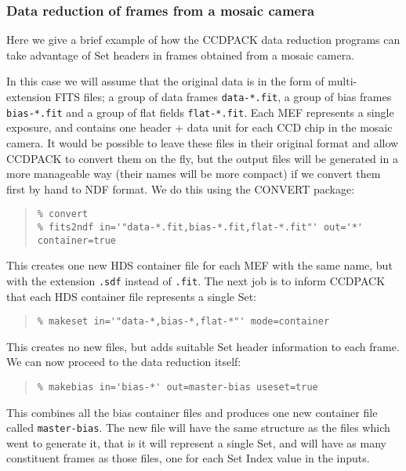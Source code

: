 \documentclass[twoside,11pt]{article}
\newcommand{\xref}[3]{#1}
\renewcommand{\_}{\texttt{\symbol{95}}}
\newenvironment{myquote}{\begin{quote}\begin{small}}{\end{small}\end{quote}}
\newcommand{\text}[1]{{\small \tt #1}}
\begin{document}
\subsubsection{Data reduction of frames from a mosaic camera}

Here we give a brief example of how the CCDPACK data reduction 
programs can take advantage of Set headers in frames obtained 
from a mosaic camera.

In this case we will assume that the original data is in the form
of multi-extension FITS files; a group of data frames \text{data-*.fit},
a group of bias frames \text{bias-*.fit} and a group of flat fields
\text{flat-*.fit}.  Each MEF represents a single exposure, 
and contains one header + data unit for each
CCD chip in the mosaic camera.
It would be possible to leave these files in their
original format and allow CCDPACK to convert them on the fly,
but the output files will be generated in a more manageable way
(their names will be more compact) if we convert them first by
hand to NDF format.  We do this using the \xref{CONVERT}{sun55}{}
package:
\begin{myquote}
\begin{verbatim}
% convert
% fits2ndf in='"data-*.fit,bias-*.fit,flat-*.fit"' out='*' container=true
\end{verbatim}
\end{myquote}
This creates one new HDS container file for each MEF with the same name,
but with the extension \text{.sdf} instead of \text{.fit}.
The next job is to inform CCDPACK that each HDS container file 
represents a single Set:
\begin{myquote}
\begin{verbatim}
% makeset in='"data-*,bias-*,flat-*"' mode=container
\end{verbatim}
\end{myquote}
This creates no new files, but adds suitable Set header information to
each frame.
We can now proceed to the data reduction itself:
\begin{myquote}
\begin{verbatim}
% makebias in='bias-*' out=master-bias useset=true
\end{verbatim}
\end{myquote}
This combines all the bias container files and produces one new
container file called \text{master-bias}.  The new file will have
the same structure as the files which went to generate it, that is
it will represent a single Set, and will have as many constituent
frames as those files, one for each Set Index value in the inputs.
\end{document}
